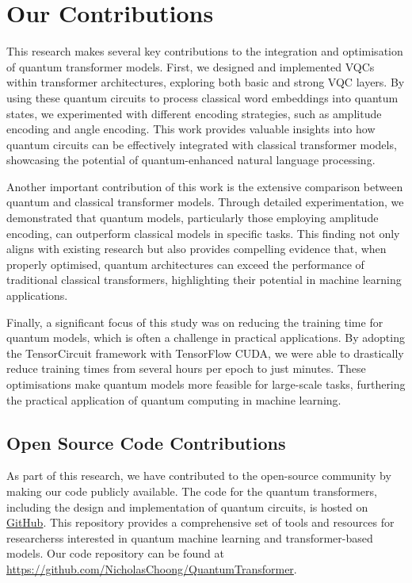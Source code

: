 \section{Our Contributions}
\label{sec:contributions}
This research makes several key contributions to the integration and
optimisation of quantum transformer models. First, we designed and
implemented \glspl{VQC} within transformer
architectures, exploring both basic and strong \gls{VQC} layers. By using
these quantum circuits to process classical word embeddings into
quantum states, we experimented with different encoding strategies,
such as amplitude encoding and angle encoding. This work provides
valuable insights into how quantum circuits can be effectively
integrated with classical transformer models, showcasing the
potential of quantum-enhanced natural language processing.

Another important contribution of this work is the extensive
comparison between quantum and classical transformer models. Through
detailed experimentation, we demonstrated that quantum models,
particularly those employing amplitude encoding, can outperform
classical models in specific tasks. This finding not only aligns with
existing research but also provides compelling evidence that, when
properly optimised, quantum architectures can exceed the performance
of traditional classical transformers, highlighting their potential
in machine learning applications.

Finally, a significant focus of this study was on reducing the
training time for quantum models, which is often a challenge in
practical applications. By adopting the TensorCircuit framework with
TensorFlow CUDA, we were able to drastically reduce training times
from several hours per epoch to just minutes. These optimisations
make quantum models more feasible for large-scale tasks, furthering
the practical application of quantum computing in machine learning.

\subsection{Open Source Code Contributions}
\label{subsec:open_source_code_contributions}

As part of this research, we have contributed to the
open-source community by making our code publicly available. The code
for the quantum transformers, including the design and implementation
of quantum circuits, is hosted on \href{https://github.com/}{GitHub}.
This repository provides a
comprehensive set of tools and resources for researcherss interested
in quantum machine learning and transformer-based models. Our code
repository can be found at
\url{https://github.com/NicholasChoong/QuantumTransformer}.

